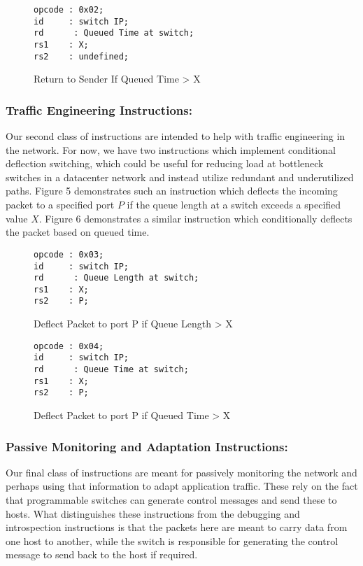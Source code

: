 \begin{figure}[tp]
\centering
\begin{verbatim}
opcode : 0x02;
id     : switch IP;
rd	    : Queued Time at switch;
rs1	   : X;
rs2	   : undefined;
\end{verbatim}
\caption{Return to Sender If Queued Time > X}
\end{figure}

\subsubsection{Traffic Engineering Instructions: }

Our second class of instructions are intended to help with traffic engineering in the network. For now, we have two instructions which implement conditional deflection switching, which could be useful for reducing load at bottleneck switches in a datacenter network and instead utilize redundant and underutilized paths. Figure 5 demonstrates such an instruction which deflects the incoming packet to a specified port $P$ if the queue length at a switch exceeds a specified value $X$. Figure 6 demonstrates a similar instruction which conditionally deflects the packet based on queued time.

\begin{figure}[tp]
\centering
\begin{verbatim}
opcode : 0x03;
id     : switch IP;
rd	    : Queue Length at switch;
rs1	   : X;
rs2	   : P;
\end{verbatim}
\caption{Deflect Packet to port P if Queue Length > X}
\end{figure}

\begin{figure}[tp]
\centering
\begin{verbatim}
opcode : 0x04;
id     : switch IP;
rd	    : Queue Time at switch;
rs1	   : X;
rs2	   : P;
\end{verbatim}
\caption{Deflect Packet to port P if Queued Time  > X}
\end{figure}

\subsubsection{Passive Monitoring and Adaptation Instructions: }

Our final class of instructions are meant for passively monitoring the network and perhaps using that information to adapt application traffic. These rely on the fact that programmable switches can generate control messages and send these to hosts. What distinguishes these instructions from the debugging and introspection instructions is that the packets here are meant to carry data from one host to another, while the switch is responsible for generating the control message to send back to the host if required. 

